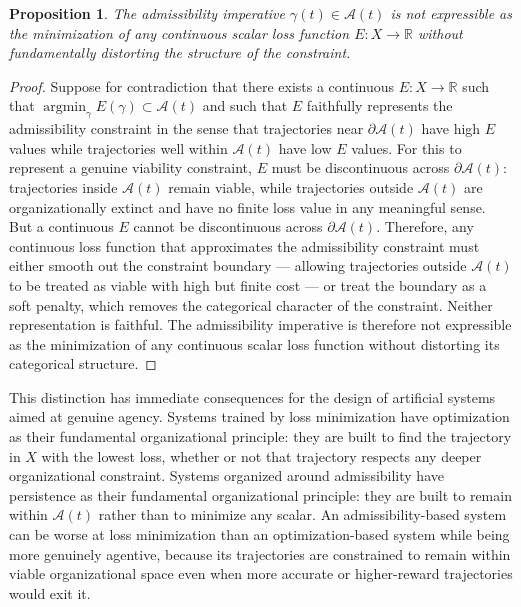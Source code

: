 \documentclass[12pt,a4paper]{report}
\theoremstyle{flyxion}
\newtheorem{proposition}[theorem]{Proposition}
\begin{document}
\begin{proposition}
The admissibility imperative $\gamma(t) \in \mathcal{A}(t)$ is not expressible as the minimization of any continuous scalar loss function $E : X \rightarrow \mathbb{R}$ without fundamentally distorting the structure of the constraint.
\end{proposition}

\begin{proof}
Suppose for contradiction that there exists a continuous $E : X \rightarrow \mathbb{R}$ such that $\operatorname*{argmin}_\gamma E(\gamma) \subset \mathcal{A}(t)$ and such that $E$ faithfully represents the admissibility constraint in the sense that trajectories near $\partial \mathcal{A}(t)$ have high $E$ values while trajectories well within $\mathcal{A}(t)$ have low $E$ values. For this to represent a genuine viability constraint, $E$ must be discontinuous across $\partial \mathcal{A}(t)$: trajectories inside $\mathcal{A}(t)$ remain viable, while trajectories outside $\mathcal{A}(t)$ are organizationally extinct and have no finite loss value in any meaningful sense. But a continuous $E$ cannot be discontinuous across $\partial \mathcal{A}(t)$. Therefore, any continuous loss function that approximates the admissibility constraint must either smooth out the constraint boundary --- allowing trajectories outside $\mathcal{A}(t)$ to be treated as viable with high but finite cost --- or treat the boundary as a soft penalty, which removes the categorical character of the constraint. Neither representation is faithful. The admissibility imperative is therefore not expressible as the minimization of any continuous scalar loss function without distorting its categorical structure.
\end{proof}

This distinction has immediate consequences for the design of artificial systems aimed at genuine agency. Systems trained by loss minimization have optimization as their fundamental organizational principle: they are built to find the trajectory in $X$ with the lowest loss, whether or not that trajectory respects any deeper organizational constraint. Systems organized around admissibility have persistence as their fundamental organizational principle: they are built to remain within $\mathcal{A}(t)$ rather than to minimize any scalar. An admissibility-based system can be worse at loss minimization than an optimization-based system while being more genuinely agentive, because its trajectories are constrained to remain within viable organizational space even when more accurate or higher-reward trajectories would exit it.
\end{document}
